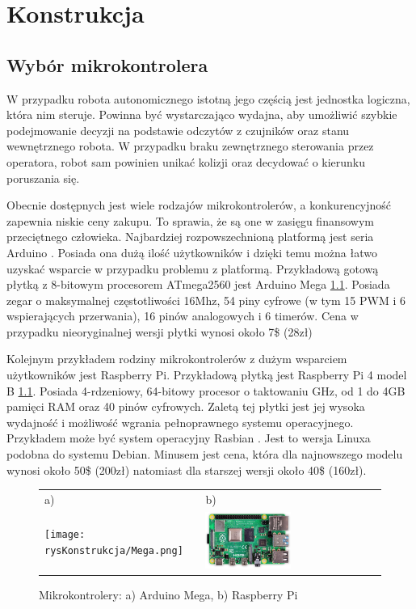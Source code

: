 \chapter{Konstrukcja}
	\section{Wybór mikrokontrolera}
		W przypadku robota autonomicznego istotną jego częścią jest jednostka logiczna, która nim steruje. Powinna być wystarczająco wydajna, aby umożliwić szybkie podejmowanie decyzji na podstawie odczytów z czujników oraz stanu wewnętrznego robota. W przypadku braku zewnętrznego sterowania przez operatora, robot sam powinien unikać kolizji oraz decydować o kierunku poruszania się.
		
		Obecnie dostępnych jest wiele rodzajów mikrokontrolerów, a konkurencyjność zapewnia niskie ceny zakupu. To sprawia, że są one w zasięgu finansowym przeciętnego człowieka. Najbardziej rozpowszechnioną platformą jest seria Arduino \cite{arduinoFramework}. Posiada ona dużą ilość użytkowników i dzięki temu można łatwo uzyskać wsparcie w przypadku problemu z platformą. Przykładową gotową płytką z 8-bitowym procesorem ATmega2560 jest Arduino Mega \ref{fig:mikrokontrolery}. Posiada zegar o maksymalnej częstotliwości 16Mhz, 54 piny cyfrowe (w tym 15 PWM i 6 wspierających przerwania), 16 pinów analogowych i 6 timerów. Cena w przypadku nieoryginalnej wersji płytki wynosi około 7\$ (28zł)
		
		Kolejnym przykładem rodziny mikrokontrolerów z dużym wsparciem użytkowników jest Raspberry Pi. Przykładową płytką jest Raspberry Pi 4 model B \ref{fig:mikrokontrolery}. Posiada 4-rdzeniowy, 64-bitowy procesor o taktowaniu GHz, od 1 do 4GB pamięci RAM oraz 40 pinów cyfrowych. Zaletą tej płytki jest jej wysoka wydajność i możliwość wgrania pełnoprawnego systemu operacyjnego. Przykładem może być system operacyjny Rasbian \cite{raspbian}. Jest to wersja Linuxa podobna do systemu Debian. Minusem jest cena, która dla najnowszego modelu wynosi około 50\$ (200zł) natomiast dla starszej wersji około 40\$ (160zł).
	
		\begin{figure}[ht]
			\centering
			\begin{tabular}{@{}ll@{}}
				a) & b) \\
				\texttt{[image: rysKonstrukcja/Mega.png]} & 
				\includegraphics[width=0.5\textwidth]{rysKonstrukcja/raspberry.jpg} \\
			\end{tabular}
			\caption{Mikrokontrolery: a) Arduino Mega, b) Raspberry Pi}
			\label{fig:mikrokontrolery}
		\end{figure}
	
